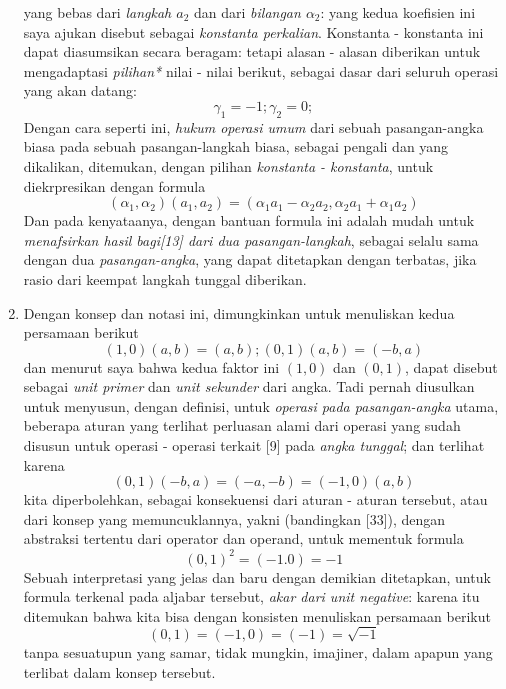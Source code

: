 \documentclass[a4paper, 12pt]{book}
\begin{document}
\begin{enumerate}
yang bebas dari \textit{langkah $a_2$} dan dari \textit{bilangan $\alpha_2$}:
yang kedua koefisien ini saya ajukan disebut sebagai 
\textit{konstanta perkalian}. Konstanta - konstanta ini dapat diasumsikan
secara beragam: tetapi alasan - alasan diberikan untuk mengadaptasi
\textit{pilihan*} nilai - nilai berikut, sebagai dasar dari seluruh
operasi yang akan datang: 
\[
\gamma_1 = -1; \gamma_2 = 0;
\]
Dengan cara seperti ini, \textit{hukum operasi umum} dari sebuah 
pasangan-angka biasa pada sebuah pasangan-langkah biasa, sebagai pengali
dan yang dikalikan, ditemukan, dengan pilihan \textit{konstanta - konstanta},
untuk diekrpresikan dengan formula
\[
(\alpha_1, \alpha_2)(a_1, a_2) = (\alpha_1 a_1 - \alpha_2 a_2, \alpha_2 a_1 + \alpha_1 a_2)
\]
Dan pada kenyataanya, dengan bantuan formula ini adalah mudah untuk
\textit{menafsirkan hasil bagi[13]  dari dua pasangan-langkah}, sebagai selalu sama
dengan dua \textit{pasangan-angka}, yang dapat ditetapkan dengan terbatas, jika
rasio dari keempat langkah tunggal diberikan.  
\item Dengan konsep dan notasi ini, dimungkinkan untuk menuliskan
kedua persamaan berikut
\[
(1, 0)(a, b) = (a, b); (0, 1)(a, b) = (-b, a)
\]
dan menurut saya bahwa kedua faktor ini $(1, 0)$ dan $(0 ,1)$, dapat disebut
sebagai \textit{unit primer} dan \textit{unit sekunder} dari angka. 
Tadi pernah
diusulkan untuk menyusun, dengan definisi, untuk 
\textit{operasi pada pasangan-angka} utama, beberapa aturan yang terlihat
perluasan alami dari operasi yang sudah disusun untuk operasi - operasi
terkait [9] pada \textit{angka tunggal}; dan terlihat karena
\[
(0, 1)(-b, a) = (-a, -b) = (-1, 0)(a, b)
\]
kita diperbolehkan, sebagai konsekuensi dari aturan - aturan tersebut, atau
dari konsep yang memuncuklannya, yakni (bandingkan [33]), dengan abstraksi 
tertentu dari operator dan operand, untuk mementuk formula
\[
(0, 1)^2 = (-1. 0) = -1
\]
Sebuah interpretasi yang jelas dan baru dengan demikian ditetapkan, untuk
formula terkenal pada aljabar tersebut, \textit{akar dari unit negative}:
karena itu ditemukan bahwa kita bisa dengan konsisten menuliskan persamaan
berikut
\[
(0, 1) = (-1, 0) = (-1) = \sqrt{-1}
\]
tanpa sesuatupun yang samar, tidak mungkin, imajiner, dalam apapun
yang terlibat dalam konsep tersebut.

\end{enumerate}
\end{document}
